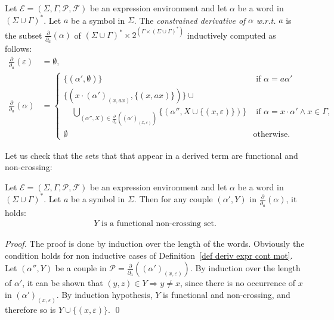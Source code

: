\documentclass[a4paper]{llncs}
\begin{document}
  \begin{definition}\label{def deriv expr cont mot}
    Let $\mathcal{E}=(\Sigma,\Gamma,\mathcal{P},\mathcal{F})$ be an expression environment and let $\alpha$ be a word in $(\Sigma\cup\Gamma)^*$. 
    Let $a$ be a symbol in $\Sigma$. 
    The \emph{constrained derivative of} $\alpha$ \emph{w.r.t.} $a$ is the subset $\frac{\partial}{\partial_a}(\alpha)$ of $(\Sigma\cup\Gamma)^*\times 2^{(\Gamma\times (\Sigma\cup\Gamma)^*)}$ inductively computed as follows:
    \begin{align*}
      \frac{\partial}{\partial_a}(\varepsilon)&=\emptyset,\\
      \frac{\partial}{\partial_a}(\alpha)&=
        \begin{cases}
            \{(\alpha',\emptyset)\} & \text{ if } \alpha=a\alpha'\\
            \{(x\cdot(\alpha')_{(x,ax)},\{(x,ax)\})\}\cup \\
            \quad \bigcup_{(\alpha'',X)\in\frac{\partial}{\partial_a}((\alpha')_{(x,\varepsilon)})} \{(\alpha'',X\cup\{(x,\varepsilon)\})\} & \text{ if }\alpha=x\cdot \alpha' \wedge x\in\Gamma,\\
            \emptyset & \text{otherwise}.
        \end{cases}
    \end{align*}
  \end{definition}
  
Let us check that the sets that that appear in a derived term are functional and non-crossing: 
  \begin{lemma}\label{lem ens deriv part ok}
    Let $\mathcal{E}=(\Sigma,\Gamma,\mathcal{P},\mathcal{F})$ be an expression environment and let $\alpha$ be a word in $(\Sigma\cup\Gamma)^*$. 
    Let $a$ be a symbol in $\Sigma$. 
    Then for any couple $(\alpha',Y)$ in $\frac{\partial}{\partial_a}(\alpha)$, it holds:
    \begin{align*}
      \text{$Y$ is a functional non-crossing set.}
    \end{align*}
  \end{lemma}
  \begin{proof}
    The proof is done by induction over the length of the words.
    Obviously the condition holds for non inductive cases of Definition~\ref{def deriv expr cont mot}.
    Let $(\alpha'',Y)$ be a couple in $\mathcal{P}=\frac{\partial}{\partial_a}((\alpha')_{(x,\varepsilon)})$.
    By induction over the length of $\alpha'$, it can be shown that $(y,z)\in Y \Rightarrow y\neq x$, since there is no occurrence of $x$ in $(\alpha')_{(x,\varepsilon)}$.
    By induction hypothesis, $Y$ is functional and non-crossing, and therefore so is $Y\cup\{(x,\varepsilon)\}$.
    \qed
  \end{proof}
  
\end{document}
